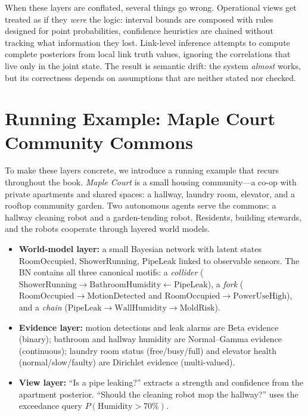 \documentclass[11pt,openany]{report}
\begin{document}
When these layers are conflated, several things go wrong.  Operational
views get treated as if they \emph{were} the logic: interval bounds
are composed with rules designed for point probabilities, confidence
heuristics are chained without tracking what information they lost.
Link-level inference attempts to compute complete posteriors from local
link truth values, ignoring the correlations that live only in the
joint state.  The result is semantic drift: the system \emph{almost}
works, but its correctness depends on assumptions that are neither
stated nor checked.


\section{Running Example: Maple Court Community Commons}
\label{sec:maple-court}

To make these layers concrete, we introduce a running example that
recurs throughout the book.  \emph{Maple Court} is a small housing
community---a co-op with private apartments and shared spaces: a
hallway, laundry room, elevator, and a rooftop community garden.  Two
autonomous agents serve the commons: a hallway cleaning robot and a
garden-tending robot.  Residents, building stewards, and the robots
cooperate through layered world models.

\begin{itemize}
\item \textbf{World-model layer:} a small Bayesian network with latent
  states $\mathrm{RoomOccupied}$, $\mathrm{ShowerRunning}$,
  $\mathrm{PipeLeak}$ linked to observable sensors.  The BN contains
  all three canonical motifs: a \emph{collider}
  ($\mathrm{ShowerRunning} \to \mathrm{BathroomHumidity} \leftarrow
   \mathrm{PipeLeak}$),
  a \emph{fork}
  ($\mathrm{RoomOccupied} \to \mathrm{MotionDetected}$ and
   $\mathrm{RoomOccupied} \to \mathrm{PowerUseHigh}$),
  and a \emph{chain}
  ($\mathrm{PipeLeak} \to \mathrm{WallHumidity} \to
   \mathrm{MoldRisk}$).
\item \textbf{Evidence layer:} motion detections and leak alarms are
  Beta evidence (binary); bathroom and hallway humidity are
  Normal--Gamma evidence (continuous); laundry room status
  (free/busy/full) and elevator health (normal/slow/faulty) are
  Dirichlet evidence (multi-valued).
\item \textbf{View layer:} ``Is a pipe leaking?'' extracts a strength
  and confidence from the apartment posterior.  ``Should the cleaning
  robot mop the hallway?'' uses the exceedance query
  $P(\mathrm{Humidity} > 70\%)$.
\end{itemize}
\end{document}
